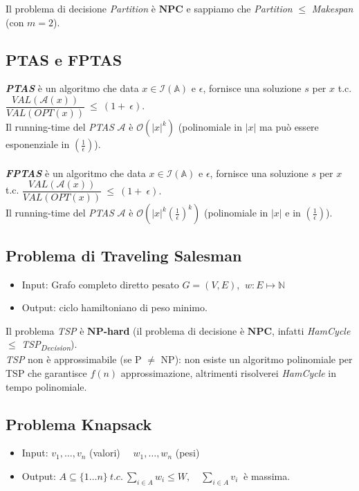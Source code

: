 \documentclass[a4paper]{article}
\theoremstyle{definition}
\newcommand{\N}{\mathbb{N}}
\newcommand{\np}{\mathbf{NP}}
\newcommand{\npc}{\mathbf{NPC}}
\begin{document}
	\noindent
	Il problema di decisione \textit{Partition} è $\npc$ e sappiamo che \textit{Partition} $\leq$ \textit{Makespan} (con $m=2$).
			
		\subsection{PTAS e FPTAS}
		\textit{\textbf{PTAS}} è un algoritmo che data $x\in \mathcal{I}(\mathbb{A})$ e $\epsilon$, fornisce una soluzione $s$ per $x$ t.c. $\dfrac{VAL(\mathcal{A}(x))}{VAL(OPT(x))}~\leq~(1+~\epsilon).$\\
		Il running-time del \textit{PTAS} $\mathcal{A}$ è $\mathcal{O}(|x|^k)$ (polinomiale in $|x|$ ma può essere esponenziale in $(\frac{1}{\epsilon})$).\\
		\\
		\textit{\textbf{FPTAS}} è un algoritmo che data $x\in \mathcal{I}(\mathbb{A})$ e $\epsilon$, fornisce una soluzione $s$ per $x$ t.c. $\dfrac{VAL(\mathcal{A}(x))}{VAL(OPT(x))}~\leq~(1+~\epsilon).$\\
		Il running-time del \textit{PTAS} $\mathcal{A}$ è $\mathcal{O}(|x|^k (\frac{1}{\epsilon})^k)$ (polinomiale in $|x|$ e in $(\frac{1}{\epsilon})$).
		
		
		\subsection{Problema di Traveling Salesman}
			\begin{itemize}
				\item Input: Grafo completo diretto pesato $ G = (V, E) $, $ \ w : E \mapsto \N $
				\item Output: ciclo hamiltoniano di peso minimo.
			\end{itemize}
		
		\noindent
		Il problema \textit{TSP} è $\np$\textbf{-hard} (il problema di decisione è $\npc$, infatti \textit{HamCycle} $\leq$ \textit{TSP\textsubscript{Decision}}).\\
		\textit{TSP} non è approssimabile (se P $\neq$ NP): non esiste un algoritmo polinomiale per TSP che garantisce $f(n)$ approssimazione, altrimenti risolverei \textit{HamCycle} in tempo polinomiale.
		
		\subsection{Problema Knapsack}
			\begin{itemize}
				\item Input: $ v_1, \dots, v_n $ (valori) $ \quad w_1, \dots, w_n $ (pesi)
				\item Output: $ A \subseteq \{1\dots n \} \ t.c.\ \sum\limits_{i \in A} w_i \leq W,\quad \sum\limits_{i \in A} v_i \ $ è massima.
			\end{itemize}
		
\end{document}
